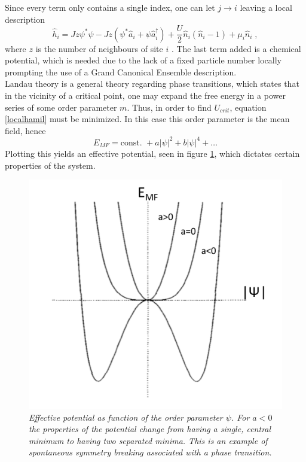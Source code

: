 Since every term only contains a single index, one can let $j \rightarrow i$ leaving a local description
\begin{equation}
	\hat{h}_i = J z \psi^* \psi - J z \left( \psi^* \hat{a}_i + \psi \hat{a}_{i}^{\dag} \right) + \frac{U}{2} \hat{n}_i \left( \hat{n}_i -1 \right) + \mu_i \hat{n}_i \; ,
	\label{localhamil}
\end{equation}
where $z$ is the number of neighbours of site $i$ \cite{vanoosten}. The last term added is a chemical potential, which is needed due to the lack of a fixed particle number locally prompting the use of a Grand Canonical Ensemble description.\\
Landau theory is a general theory regarding phase transitions, which states that in the vicinity of a critical point, one may expand the free energy in a power series of some order parameter $m$. Thus, in order to find $U_{crit}$, equation \ref{localhamil} must be minimized. In this case this order parameter is the mean field, hence
\begin{equation}
	E_{MF} = \text{const. } + a |\psi|^2 + b |\psi|^4 + \ldots \label{eq:landau}
\end{equation} 
Plotting this yields an effective potential, seen in figure \ref{fig:landau}, which dictates certain properties of the system.
\begin{figure}[!h]
\centering
\includegraphics[width=0.7\columnwidth]{Figures/Landau_theory.pdf} 
\caption{	\textit{Effective potential as function of the order parameter $\psi$. For $a<0$ the properties of the potential change from having a single, central minimum to having two separated minima. This is an example of spontaneous symmetry breaking associated with a phase transition. \cite{plischke}}}
\label{fig:landau} 
\end{figure} 

